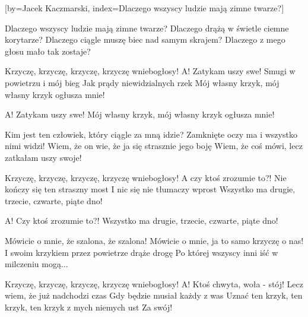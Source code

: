[by={Jacek Kaczmarski},
                     index={Dlaczego wszyscy ludzie mają zimne twarze?}]
\beginverse

Dlaczego wszyscy ludzie mają zimne twarze?
Dlaczego drążą w świetle ciemne korytarze?
Dlaczego ciągle muszę biec nad samym skrajem?
Dlaczego z mego głosu mało tak zostaje?

\endverse
\beginverse

Krzyczę, krzyczę, krzyczę, krzyczę wniebogłosy!
A! Zatykam uszy swe!
Smugi w powietrzu i mój bieg
Jak prądy niewidzialnych rzek
Mój własny krzyk, mój własny krzyk ogłusza mnie!

\endverse
\beginverse

A! Zatykam uszy swe!
Mój własny krzyk, mój własny krzyk ogłusza mnie!

\endverse
\beginverse

Kim jest ten człowiek, który ciągle za mną idzie?
Zamknięte oczy ma i wszystko nimi widzi!
Wiem, że on wie, że ja się strasznie jego boję
Wiem, że coś mówi, lecz zatkałam uszy swoje!

\endverse
\beginverse

Krzyczę, krzyczę, krzyczę, krzyczę wniebogłosy!
A czy ktoś zrozumie to?!
Nie kończy się ten straszny most
I nic się nie tłumaczy wprost
Wszystko ma drugie, trzecie, czwarte, piąte dno!

\endverse
\beginverse

A! Czy ktoś zrozumie to?!
Wszystko ma drugie, trzecie, czwarte, piąte dno!

\endverse
\beginverse

Mówicie o mnie, że szalona, że szalona!
Mówicie o mnie, ja to samo krzyczę o nas!
I swoim krzykiem przez powietrze drąże drogę
Po której wszyscy inni iść w milczeniu mogą...

\endverse
\beginverse

Krzyczę, krzyczę, krzyczę, krzyczę wniebogłosy!
A! Ktoś chwyta, woła - stój!
Lecz wiem, że już nadchodzi czas
Gdy będzie musiał każdy z was
Uznać ten krzyk, ten krzyk, ten krzyk z mych niemych ust
Za swój!

\endverse
\endsong